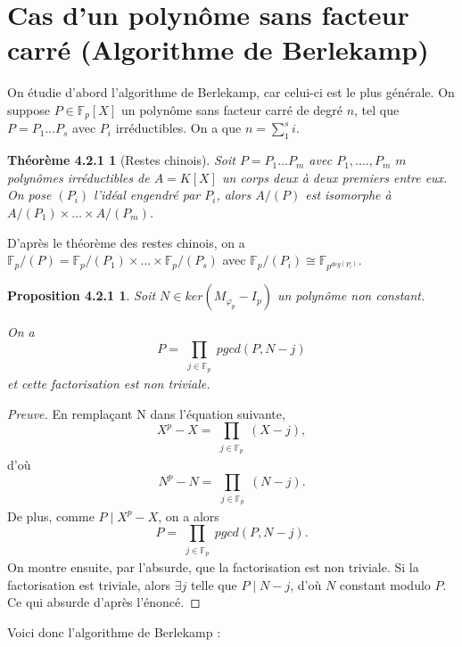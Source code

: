 \section{Cas d'un polynôme sans facteur carré (Algorithme de Berlekamp)}
\label{Cas d'un polynôme sans facteur carré (Algorithme de Berlekamp)}

	On étudie d'abord l'algorithme de Berlekamp, car celui-ci est le plus générale.
	On suppose $P\in\mathbb{F}_{p}[X]$ un polynôme sans facteur carré de degré $n$, tel que $P=P_{1}\ldots P_{s}$ avec $P_{i}$ irréductibles.
	On a que $n=\sum_{1}^{s} i$.

\newtheorem*{theo3}{Théorème 4.2.1}
\begin{theo3}[Restes chinois]
	Soit $P=P_{1}\ldots P_{m}$ avec $P_{1},.\ldots, P_{m}$ $m$ polynômes irréductibles de $A=K[X]$ un corps deux à deux premiers entre eux.
	On pose $(P_{i})$ l'idéal engendré par $P_{i}$, alors $A/(P)$ est isomorphe à $A/(P_{1})\times\ldots\times A/(P_{m})$.
\end{theo3}


	D'après le théorème des restes chinois, on a $\mathbb{F}_{p}/(P)=\mathbb{F}_{p}/(P_{1})\times\ldots\times\mathbb{F}_{p}/(P_{s})$ avec $\mathbb{F}_{p}/(P_{i})\cong\mathbb{F}_{p^{deg(P_{i})}}$.

\newtheorem*{prop11}{Proposition 4.2.1}
\begin{prop11}
	Soit $N\in ker(M_{\varphi_{p}}-I_{p})$ un polynôme non constant.

	On a $$P=\prod\limits_{\substack{j\in\mathbb{F}_{p}}}{pgcd(P,N-j)}$$ et cette factorisation est non triviale.
\end{prop11}

\begin{proof}[Preuve]
	En remplaçant N dans l'équation suivante, $$X^{p}-X=\prod\limits_{\substack{j\in\mathbb{F}_{p}}}{(X-j)},$$ d'où $$N^{p}-N=\prod\limits_{\substack{j\in\mathbb{F}_{p}}}{(N-j)}.$$
	De plus, comme $P\mid X^{p}-X$, on a alors $$P=\prod\limits_{\substack{j\in\mathbb{F}_{p}}}{pgcd(P,N-j)}.$$
	On montre ensuite, par l'absurde, que la factorisation est non triviale.
	Si la factorisation est triviale, alors $\exists j$ telle que $P\mid N-j$, d'où $N$ constant modulo $P$.
	Ce qui absurde d'après l'énoncé.
\end{proof}


Voici donc l'algorithme de Berlekamp :

